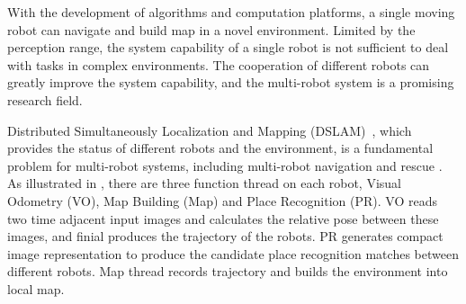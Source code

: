 \label{sec:intro}

With the development of algorithms and computation platforms, a single moving robot can navigate and build map in a novel environment. 
Limited by the perception range, the system capability of a single robot is not sufficient to deal with tasks in complex environments.
The cooperation of different robots can greatly improve the system capability, and the multi-robot system is a promising research field.

Distributed Simultaneously Localization and Mapping (DSLAM)~\cite{corah2019communication, cieslewski2018data}, which provides the status of different robots and the environment, is a fundamental problem for multi-robot systems, including multi-robot navigation \cite{tanner2005towards} and rescue \cite{baxter2007multi}. As illustrated in , there are three function thread on each robot, Visual Odometry (VO), Map Building (Map) and Place Recognition (PR). VO reads two time adjacent input images and calculates the relative pose between these images, and finial produces the trajectory of the robots. PR generates compact image representation to produce the candidate place recognition matches between different robots. Map thread records trajectory and builds the environment into local map.

